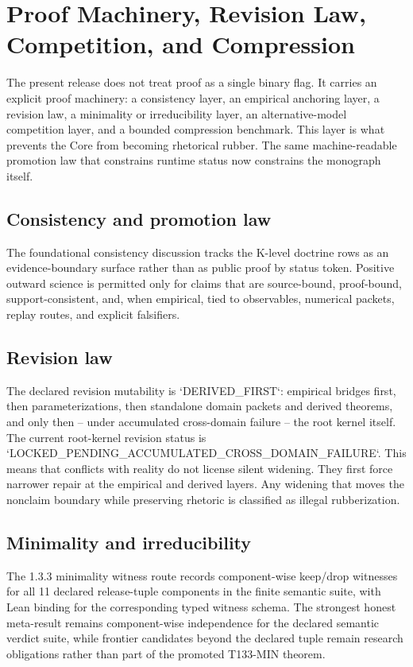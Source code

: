 \section{Proof Machinery, Revision Law, Competition, and Compression}

The present release does not treat proof as a single binary flag. It carries an explicit proof machinery: a consistency layer, an empirical anchoring layer, a revision law, a minimality or irreducibility layer, an alternative-model competition layer, and a bounded compression benchmark.
This layer is what prevents the Core from becoming rhetorical rubber. The same machine-readable promotion law that constrains runtime status now constrains the monograph itself.

\subsection{Consistency and promotion law}
The foundational consistency discussion tracks the K-level doctrine rows as an evidence-boundary surface rather than as public proof by status token.
Positive outward science is permitted only for claims that are source-bound, proof-bound, support-consistent, and, when empirical, tied to observables, numerical packets, replay routes, and explicit falsifiers.

\subsection{Revision law}
The declared revision mutability is `DERIVED\_FIRST`: empirical bridges first, then parameterizations, then standalone domain packets and derived theorems, and only then -- under accumulated cross-domain failure -- the root kernel itself.
The current root-kernel revision status is `LOCKED\_PENDING\_ACCUMULATED\_CROSS\_DOMAIN\_FAILURE`.
This means that conflicts with reality do not license silent widening. They first force narrower repair at the empirical and derived layers. Any widening that moves the nonclaim boundary while preserving rhetoric is classified as illegal rubberization.

\subsection{Minimality and irreducibility}
The 1.3.3 minimality witness route records component-wise keep/drop witnesses for all 11 declared release-tuple components in the finite semantic suite, with Lean binding for the corresponding typed witness schema.
The strongest honest meta-result remains component-wise independence for the declared semantic verdict suite, while frontier candidates beyond the declared tuple remain research obligations rather than part of the promoted T133-MIN theorem.

